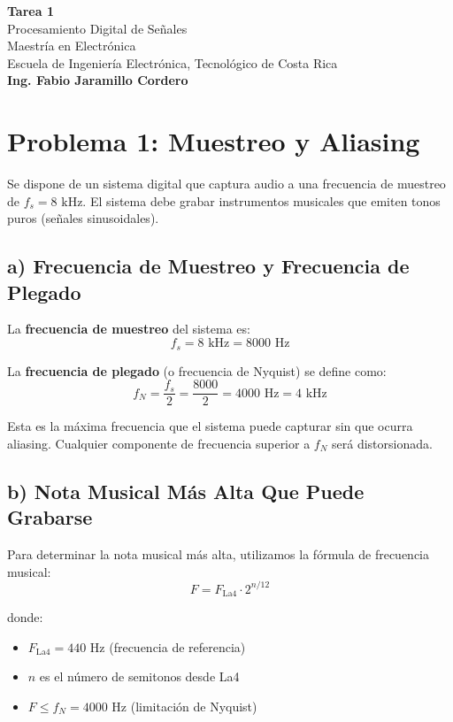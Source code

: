 \documentclass[12pt]{article}
\begin{document}
\begin{center}
    \textbf{\large Tarea 1} \\[0.5em]
    Procesamiento Digital de Señales \\
    Maestría en Electrónica \\
    Escuela de Ingeniería Electrónica, Tecnológico de Costa Rica \\
    \textbf{Ing. Fabio Jaramillo Cordero}
\end{center}

\section{Problema 1: Muestreo y Aliasing}

Se dispone de un sistema digital que captura audio a una frecuencia de muestreo de \(f_s = 8 \text{ kHz}\). El sistema debe grabar instrumentos musicales que emiten tonos puros (señales sinusoidales).
 
\subsection*{a) Frecuencia de Muestreo y Frecuencia de Plegado}
 
La \textbf{frecuencia de muestreo} del sistema es:
\[
f_s = 8 \text{ kHz} = 8000 \text{ Hz}
\]
 
La \textbf{frecuencia de plegado} (o frecuencia de Nyquist) se define como:
\[
f_N = \frac{f_s}{2} = \frac{8000}{2} = 4000 \text{ Hz} = 4 \text{ kHz}
\]
 
Esta es la máxima frecuencia que el sistema puede capturar sin que ocurra aliasing. Cualquier componente de frecuencia superior a \(f_N\) será distorsionada.
 
\subsection*{b) Nota Musical Más Alta Que Puede Grabarse}
 
Para determinar la nota musical más alta, utilizamos la fórmula de frecuencia musical:
\[
F = F_{\text{La4}} \cdot 2^{n/12}
\]
 
donde:
\begin{itemize}
    \item \(F_{\text{La4}} = 440 \text{ Hz}\) (frecuencia de referencia)
    \item \(n\) es el número de semitonos desde La4
    \item \(F \leq f_N = 4000 \text{ Hz}\) (limitación de Nyquist)
\end{itemize}
 
\end{document}
